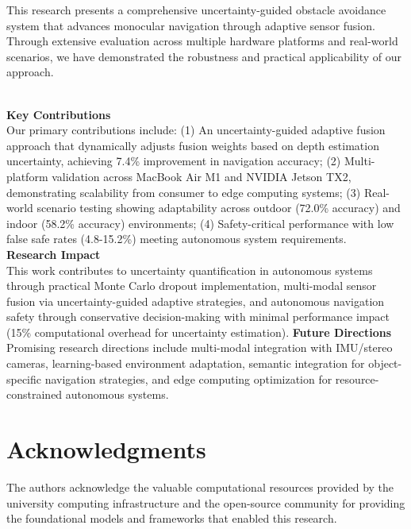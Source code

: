 \documentclass[12pt,oneside]{book}
\begin{document}
This research presents a comprehensive uncertainty-guided obstacle avoidance system that advances monocular navigation through adaptive sensor fusion. Through extensive evaluation across multiple hardware platforms and real-world scenarios, we have demonstrated the robustness and practical applicability of our approach.

\textbf{\\Key Contributions}
\\Our primary contributions include: (1) An uncertainty-guided adaptive fusion approach that dynamically adjusts fusion weights based on depth estimation uncertainty, achieving 7.4\% improvement in navigation accuracy; (2) Multi-platform validation across MacBook Air M1 and NVIDIA Jetson TX2, demonstrating scalability from consumer to edge computing systems; (3) Real-world scenario testing showing adaptability across outdoor (72.0\% accuracy) and indoor (58.2\% accuracy) environments; (4) Safety-critical performance with low false safe rates (4.8-15.2\%) meeting autonomous system requirements.
\vspace{2cm}
\textbf{\\Research Impact}
\\This work contributes to uncertainty quantification in autonomous systems through practical Monte Carlo dropout implementation, multi-modal sensor fusion via uncertainty-guided adaptive strategies, and autonomous navigation safety through conservative decision-making with minimal performance impact (15\% computational overhead for uncertainty estimation).
\vspace{2cm}
\textbf{Future Directions}
Promising research directions include multi-modal integration with IMU/stereo cameras, learning-based environment adaptation, semantic integration for object-specific navigation strategies, and edge computing optimization for resource-constrained autonomous systems.

\section*{Acknowledgments}

The authors acknowledge the valuable computational resources provided by the university computing infrastructure and the open-source community for providing the foundational models and frameworks that enabled this research.
\end{document}
